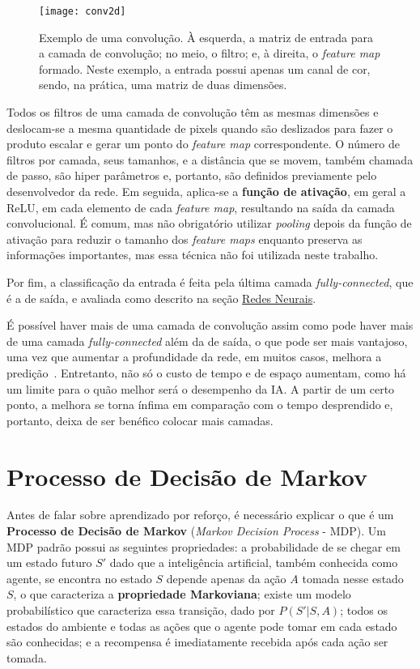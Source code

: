 \begin{figure}[h!]
\texttt{[image: conv2d]}
\centering
\caption{Exemplo de uma convolução. À esquerda, a matriz de entrada para a camada de convolução; no meio, o filtro; e, à direita, o \textit{feature map} formado. Neste exemplo, a entrada possui apenas um canal de cor, sendo, na prática, uma matriz de duas dimensões.}
\label{fig:conv2d}
\end{figure}

Todos os filtros de uma camada de convolução têm as mesmas dimensões e deslocam-se a mesma quantidade de pixels quando são deslizados para fazer o produto escalar e gerar um ponto do \textit{feature map} correspondente.
O número de filtros por camada, seus tamanhos, e a distância que se movem, também chamada de passo, são hiper parâmetros e, portanto, são definidos previamente pelo desenvolvedor da rede.
Em seguida, aplica-se a \textbf{função de ativação}, em geral a ReLU, em cada elemento de cada \textit{feature map}, resultando na saída da camada convolucional.
É comum, mas não obrigatório utilizar \textit{pooling} depois da função de ativação para reduzir o tamanho dos \textit{feature maps} enquanto preserva as informações importantes, mas essa técnica não foi utilizada neste trabalho.

Por fim, a classificação da entrada é feita pela última camada \textit{fully-connected}, que é a de saída, e avaliada como descrito na seção \hyperref[sec:nn]{Redes Neurais}.

É possível haver mais de uma camada de convolução assim como pode haver mais de uma camada \textit{fully-connected} além da de saída, o que pode ser mais vantajoso, uma vez que aumentar a profundidade da rede, em muitos casos, melhora a predição~\cite{Goodfellow-et-al-2016}.
Entretanto, não só o custo de tempo e de espaço aumentam, como há um limite para o quão melhor será o desempenho da IA.
A partir de um certo ponto, a melhora se torna ínfima em comparação com o tempo desprendido e, portanto, deixa de ser benéfico colocar mais camadas.


\section{Processo de Decisão de Markov}
\label{sec:mdp}

Antes de falar sobre aprendizado por reforço, é necessário explicar o que é um \textbf{Processo de Decisão de Markov} (\textit{Markov Decision Process} - MDP).
Um MDP padrão possui as seguintes propriedades:
a probabilidade de se chegar em um estado futuro $S'$ dado que a inteligência artificial, também conhecida como agente, se encontra no estado $S$ depende apenas da ação $A$ tomada nesse estado $S$, o que caracteriza a \textbf{propriedade Markoviana};
existe um modelo probabilístico que caracteriza essa transição, dado por $P(S'|S,A)$;
todos os estados do ambiente e todas as ações que o agente pode tomar em cada estado são conhecidas;
e a recompensa é imediatamente recebida após cada ação ser tomada.

